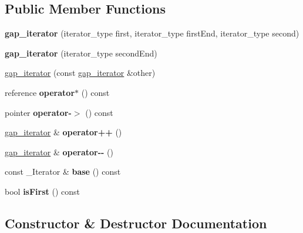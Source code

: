 \subsection*{Public Member Functions}
\begin{DoxyCompactItemize}
\item 
\mbox{\label{classgap__iterator_a512af37d48e925c281947a8a5872cc7c}} 
{\bfseries gap\+\_\+iterator} (iterator\+\_\+type first, iterator\+\_\+type first\+End, iterator\+\_\+type second)
\item 
\mbox{\label{classgap__iterator_a8a2081d9c80b1ffdd51412bdcd2cfb10}} 
{\bfseries gap\+\_\+iterator} (iterator\+\_\+type second\+End)
\item 
\mbox{\hyperlink{classgap__iterator_a00a64884204c32b57d497044c6ce43cf}{gap\+\_\+iterator}} (const \mbox{\hyperlink{classgap__iterator}{gap\+\_\+iterator}} \&other)
\item 
\mbox{\label{classgap__iterator_ad02776871a11b53d3e1dc6801cdc18f7}} 
reference {\bfseries operator$\ast$} () const
\item 
\mbox{\label{classgap__iterator_ade390054c325f16e445473d8e4776329}} 
pointer {\bfseries operator-\/$>$} () const
\item 
\mbox{\label{classgap__iterator_ac2a393a925ecd11c433ac992836b8f10}} 
\mbox{\hyperlink{classgap__iterator}{gap\+\_\+iterator}} \& {\bfseries operator++} ()
\item 
\mbox{\label{classgap__iterator_a944dcda4848afdc163e498dc980e137e}} 
\mbox{\hyperlink{classgap__iterator}{gap\+\_\+iterator}} \& {\bfseries operator-\/-\/} ()
\item 
\mbox{\label{classgap__iterator_adeca69a74de5e6007005555fb1abed7d}} 
const \+\_\+\+Iterator \& {\bfseries base} () const
\item 
\mbox{\label{classgap__iterator_a8383b9be265433c14f9c390e56f293cd}} 
bool {\bfseries is\+First} () const
\end{DoxyCompactItemize}


\subsection{Constructor \& Destructor Documentation}
\mbox{\label{classgap__iterator_a00a64884204c32b57d497044c6ce43cf}} 
